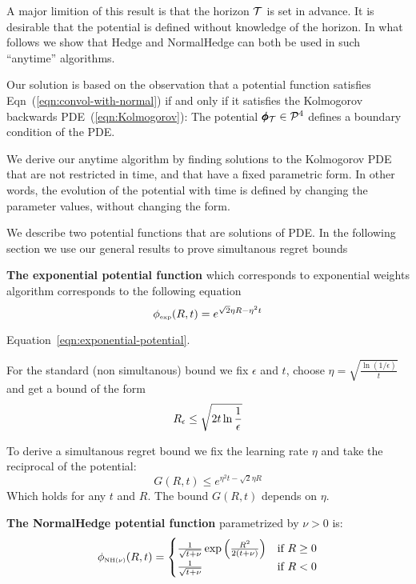 \documentclass[anon,12pt]{colt2024} %
\begin{document}
A major limition of this result is that the horizon $\mathcal{T}$ is set in
advance.  It is desirable that the potential is defined without
knowledge of the horizon.  In what follows we show that Hedge and
NormalHedge can both be used in such ``anytime'' algorithms.

Our solution is based on the observation that a potential function satisfies Eqn~(\ref{eqn:convol-with-normal}) if and only if it satisfies 
the Kolmogorov backwards PDE~(\ref{eqn:Kolmogorov}):
The potential $\pmb{\phi}_{\mathcal{T}} \in {\cal P}^{4}$ defines a boundary condition of the PDE.

We derive our anytime algorithm by finding solutions to the Kolmogorov
PDE that are not restricted in time, and that have a fixed parametric
form.  In other words, the evolution of the potential with time is
defined by changing the parameter values, without changing the form.

We describe two potential functions that are solutions of PDE. In the following section we use our general results to prove simultanous regret bounds

{\bf The exponential potential function} which corresponds to exponential
  weights algorithm corresponds to the following equation
\begin{equation} \label{eqn:exponential-potential}
    \phi_{\mbox{\tiny exp}}(R,t) = e^{\sqrt{2} \eta R - \eta^2 t}
\end{equation}

Equation~\ref{eqn:exponential-potential}.

For the standard (non simultanous) bound we fix $\epsilon$ and $t$,
choose $\eta = \sqrt{\frac{\ln (1/\epsilon)}{t}}$
and get a bound of the form 
  \begin{equation}
    R_\epsilon \leq \sqrt{2 t \ln \frac{1}{\epsilon}}
  \end{equation}

  To derive a simultanous regret bound we fix the learning rate $\eta$ and take the reciprocal of the potential:
 \[
    G(R,t) \leq e^{\eta^2 t - \sqrt{2}\eta R}
 \]
Which holds for any $t$ and $R$. The bound $G(R,t)$ depends on $\eta$.

  
{\bf The NormalHedge potential function} parametrized by $\nu>0$ is:
\begin{equation} \label{eqn:NormalHedge}
  \phi_{\mbox{\tiny NH$(\nu)$}}(R,t) = \begin{cases}
    \frac{1}{\sqrt{t+\nu}}\exp\left(\frac{R^2}{2(t+\nu)}\right)
    & \mbox{if } R \geq 0  \\
  \frac{1}{\sqrt{t+\nu}} & \mbox{if } R <0
  \end{cases}
\end{equation}
\end{document}
